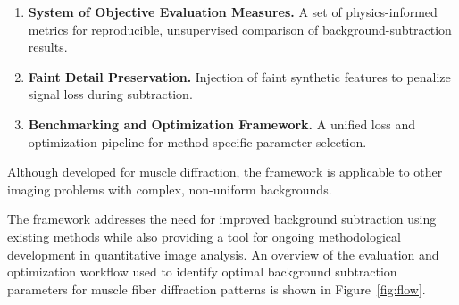 \documentclass[iucr]{iucrjournals}
\begin{document}





\begin{enumerate}
\item \textbf{System of Objective Evaluation Measures.} A set of physics-informed metrics for reproducible, unsupervised comparison of background-subtraction results.
\item \textbf{Faint Detail Preservation.} Injection of faint synthetic features to penalize signal loss during subtraction.
\item \textbf{Benchmarking and Optimization Framework.} A unified loss and optimization pipeline for method-specific parameter selection.
\end{enumerate}



Although developed for muscle diffraction, the framework is applicable to other imaging problems with complex, non-uniform backgrounds.

The framework addresses the need for improved background subtraction using existing methods while also providing a tool for ongoing methodological development in quantitative image analysis. An overview of the evaluation and optimization workflow used to identify optimal background subtraction parameters for muscle fiber diffraction patterns is shown in Figure~\ref{fig:flow}.
\end{document}
